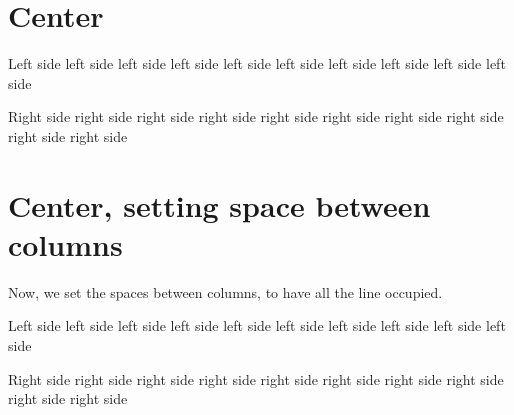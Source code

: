 \documentclass{article}
\begin{document}
\section{Center}

\begin{pairs}

\begin{Leftside}
\beginnumbering
\pstart
Left side left side left side left side left side left side left side left side left side left side
\pend
\endnumbering
\end{Leftside}

\begin{Rightside}
\beginnumbering
\pstart
Right side right side right side right side right side right side right side right side right side right side
\pend
\endnumbering
\end{Rightside}
\end{pairs}
\Columns

\section{Center, setting space between columns}

Now, we set the spaces between columns, to have all the line occupied.

\setlength{\beforecolumnseparator}{0.06\textwidth}
\setlength{\aftercolumnseparator}{0.06\textwidth}

\vspace{\baselineskip}

\begin{pairs}

\begin{Leftside}
\beginnumbering
\pstart
Left side left side left side left side left side left side left side left side left side left side
\pend
\endnumbering
\end{Leftside}

\begin{Rightside}
\beginnumbering
\pstart
Right side right side right side right side right side right side right side right side right side right side
\pend
\endnumbering
\end{Rightside}
\end{pairs}
\Columns
\end{document}
